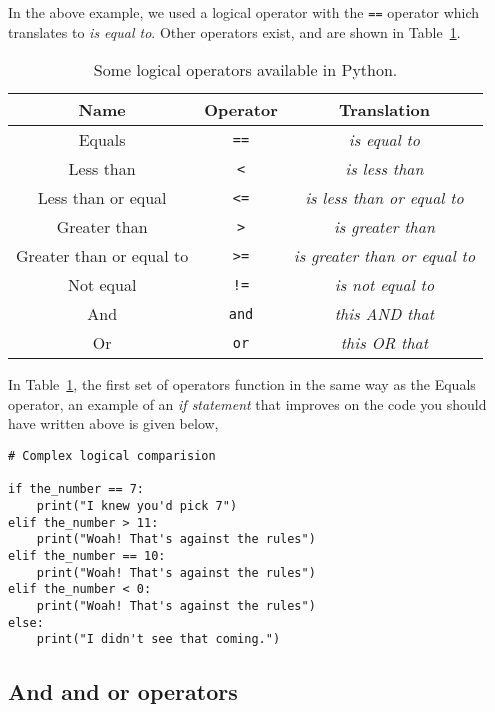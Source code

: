 \documentclass[a4paper]{article}
\begin{document}
In the above example, we used a logical operator with the \texttt{==} operator which translates to \emph{is equal to}. 
Other operators exist, and are shown in Table~\ref{tab:ops}.
\begin{table}[h]
	\centering
	\caption{Some logical operators available in Python.}
	\label{tab:ops}
	\begin{tabular}{c c c}
		\hline
		Name & Operator & Translation \\
		\hline
		Equals & \texttt{==} & \emph{is equal to} \\
		Less than & \texttt{<} & \emph{is less than} \\
		Less than or equal & \texttt{<=} & \emph{is less than or equal to} \\
		Greater than & \texttt{>} & \emph{is greater than} \\
		Greater than or equal to & \texttt{>=} & \emph{is greater than or equal to} \\
		Not equal & \texttt{!=} & \emph{is not equal to} \\
		\hline
	    And & \texttt{and} & \emph{this AND that} \\
	    Or & \texttt{or} & \emph{this OR that} \\
		\hline
	\end{tabular}
\end{table}
In Table~\ref{tab:ops}, the first set of operators function in the same way as the Equals operator, an example of an \emph{if statement} that improves on the code you should have written above is given below,
\begin{lstlisting}
# Complex logical comparision

if the_number == 7:
    print("I knew you'd pick 7")
elif the_number > 11:
    print("Woah! That's against the rules")
elif the_number == 10:
    print("Woah! That's against the rules")
elif the_number < 0:
    print("Woah! That's against the rules")
else:
    print("I didn't see that coming.")
\end{lstlisting}

\subsection{And and or operators}





\end{document}
